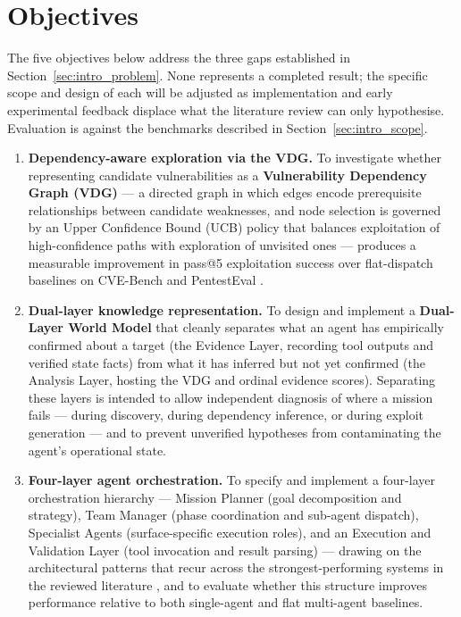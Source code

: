 \section{Objectives}
\label{sec:intro_objectives}

The five objectives below address the three gaps established in Section~\ref{sec:intro_problem}. None represents a completed result; the specific scope and design of each will be adjusted as implementation and early experimental feedback displace what the literature review can only hypothesise. Evaluation is against the benchmarks described in Section~\ref{sec:intro_scope}.

\begin{enumerate}
	\item \textbf{Dependency-aware exploration via the VDG.} To investigate whether representing candidate vulnerabilities as a \textbf{Vulnerability Dependency Graph (VDG)} --- a directed graph in which edges encode prerequisite relationships between candidate weaknesses, and node selection is governed by an Upper Confidence Bound (UCB) policy that balances exploitation of high-confidence paths with exploration of unvisited ones --- produces a measurable improvement in pass@5 exploitation success over flat-dispatch baselines on CVE-Bench \citep{zhu2025cvebench} and PentestEval \citep{yang2025pentesteval}.

	\item \textbf{Dual-layer knowledge representation.} To design and implement a \textbf{Dual-Layer World Model} that cleanly separates what an agent has empirically confirmed about a target (the Evidence Layer, recording tool outputs and verified state facts) from what it has inferred but not yet confirmed (the Analysis Layer, hosting the VDG and ordinal evidence scores). Separating these layers is intended to allow independent diagnosis of where a mission fails --- during discovery, during dependency inference, or during exploit generation --- and to prevent unverified hypotheses from contaminating the agent's operational state.

	\item \textbf{Four-layer agent orchestration.} To specify and implement a four-layer orchestration hierarchy --- Mission Planner (goal decomposition and strategy), Team Manager (phase coordination and sub-agent dispatch), Specialist Agents (surface-specific execution roles), and an Execution and Validation Layer (tool invocation and result parsing) --- drawing on the architectural patterns that recur across the strongest-performing systems in the reviewed literature \citep{zhu2024hptsa,kong2025vulnbot,singer2025incalmo}, and to evaluate whether this structure improves performance relative to both single-agent and flat multi-agent baselines.


\end{enumerate}

